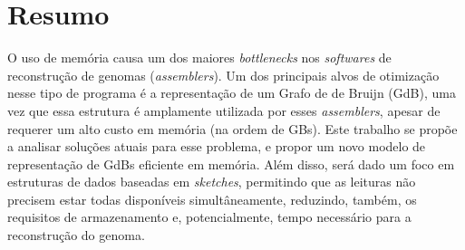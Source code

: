 \section{Resumo}

O uso de memória causa um dos maiores \emph{bottlenecks} nos \emph{softwares} de reconstrução
de genomas (\emph{assemblers}). Um dos principais alvos de otimização nesse tipo de programa
é a representação de um Grafo de de Bruijn (GdB), uma vez que essa estrutura é amplamente utilizada
por esses \emph{assemblers}, apesar de requerer um alto custo em memória (na ordem de GBs).
Este trabalho se propõe a analisar soluções atuais para esse problema, e propor um novo modelo
de representação de GdBs eficiente em memória. Além disso, será dado um foco em estruturas de dados
baseadas em \emph{sketches}, permitindo que as leituras não precisem estar todas disponíveis simultâneamente,
reduzindo, também, os requisitos de armazenamento e, potencialmente, tempo necessário para a reconstrução
do genoma.